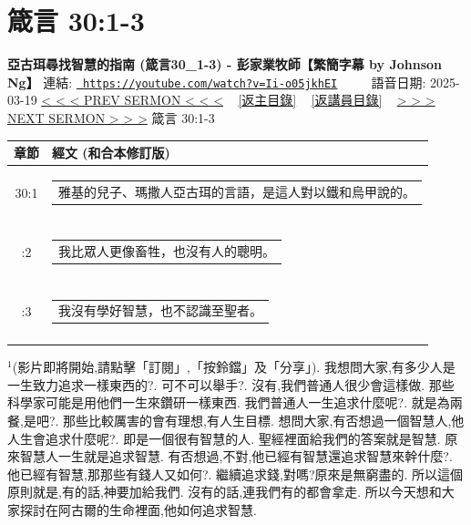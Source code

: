 \documentclass{book}
\begin{document}
\section{箴言 30:1-3}
\label{sec:Ii_o05jkhEI}
\textbf{亞古珥尋找智慧的指南 (箴言30\_1-3) - 彭家業牧師【繁簡字幕 by Johnson Ng】}
\newline
\newline
連結: \href{https://youtube.com/watch?v=Ii-o05jkhEI}{\texttt{ https://youtube.com/watch?v=Ii-o05jkhEI}} ~~~~ 語音日期: 2025-03-19 
\newline
\newline
\hyperref[sec:0swvj1WD4mE]{< < < PREV SERMON < < <}
~
\hyperlink{toc}{[返主目錄]}
~
\hyperref[ch:preacher2]{[返講員目錄]}
~
\hyperref[sec:pb5NDTZL6gI]{> > > NEXT SERMON > > >}
\newline
\newline
箴言 30:1-3
\newline
\begin{longtable}{cl}
\hline
\hline
章節 & 經文 (和合本修訂版)\\
\hline
30:1 & \begin{tabularx}{0.7\textwidth}{X} 雅基的兒子、瑪撒人亞古珥的言語，是這人對以鐵和烏甲說的。 \end{tabularx} \\ \\ \relax
30:2 & \begin{tabularx}{0.7\textwidth}{X} 我比眾人更像畜牲，也沒有人的聰明。 \end{tabularx} \\ \\ \relax
30:3 & \begin{tabularx}{0.7\textwidth}{X} 我沒有學好智慧，也不認識至聖者。 \end{tabularx} \\ \\
[1ex]
\hline
\hline
\end{longtable}
$^{1}$(影片即將開始,請點擊「訂閱」,「按鈴鐺」及「分享」).
我想問大家,有多少人是一生致力追求一樣東西的?.
可不可以舉手?.
沒有,我們普通人很少會這樣做.
那些科學家可能是用他們一生來鑽研一樣東西.
我們普通人一生追求什麼呢?.
就是為兩餐,是吧?.
那些比較厲害的會有理想,有人生目標.
想問大家,有否想過一個智慧人,他人生會追求什麼呢?.
即是一個很有智慧的人.
聖經裡面給我們的答案就是智慧.
原來智慧人一生就是追求智慧.
有否想過,不對,他已經有智慧還追求智慧來幹什麼?.
他已經有智慧,那那些有錢人又如何?.
繼續追求錢,對嗎?原來是無窮盡的.
所以這個原則就是,有的話,神要加給我們.
沒有的話,連我們有的都會拿走.
所以今天想和大家探討在阿古爾的生命裡面,他如何追求智慧.
\end{document}

